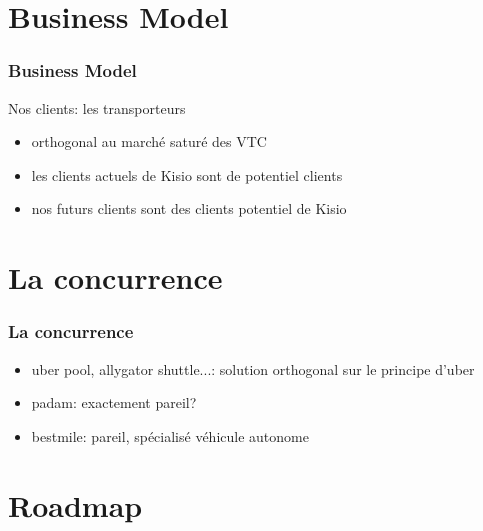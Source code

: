 \documentclass[table]{beamer}
\begin{document}
\section{Business Model}

\begin{frame}
  \frametitle{Business Model}

  Nos clients: les transporteurs
  \begin{itemize}
  \item orthogonal au marché saturé des VTC
  \item les clients actuels de Kisio sont de potentiel clients
  \item nos futurs clients sont des clients potentiel de Kisio
  \end{itemize}
\end{frame}

\section{La concurrence}

\begin{frame}
  \frametitle{La concurrence}

  \begin{itemize}
  \item uber pool, allygator shuttle...: solution orthogonal sur le
    principe d'uber
  \item padam: exactement pareil?
  \item bestmile: pareil, spécialisé véhicule autonome
  \end{itemize}
\end{frame}

\section{Roadmap}
\end{document}
